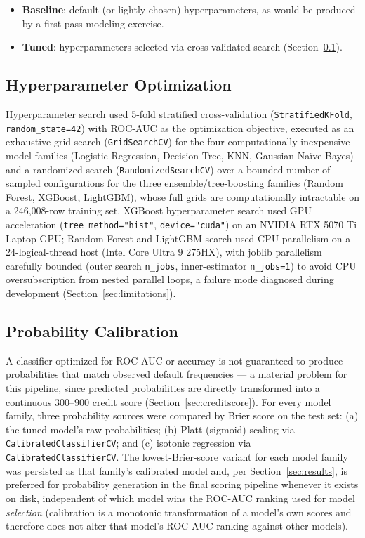 \documentclass[journal]{IEEEtran}
\begin{document}
\begin{itemize}
\item \textbf{Baseline}: default (or lightly chosen) hyperparameters, as would be produced by a first-pass modeling exercise.
\item \textbf{Tuned}: hyperparameters selected via cross-validated search (Section~\ref{sec:hpo}).
\end{itemize}

\subsection{Hyperparameter Optimization}
\label{sec:hpo}

Hyperparameter search used 5-fold stratified cross-validation (\texttt{StratifiedKFold}, \texttt{random\_state=42}) with ROC-AUC as the optimization objective, executed as an exhaustive grid search (\texttt{GridSearchCV}) for the four computationally inexpensive model families (Logistic Regression, Decision Tree, KNN, Gaussian Naïve Bayes) and a randomized search (\texttt{RandomizedSearchCV}) over a bounded number of sampled configurations for the three ensemble/tree-boosting families (Random Forest, XGBoost, LightGBM), whose full grids are computationally intractable on a 246,008-row training set. XGBoost hyperparameter search used GPU acceleration (\texttt{tree\_method="hist"}, \texttt{device="cuda"}) on an NVIDIA RTX 5070 Ti Laptop GPU; Random Forest and LightGBM search used CPU parallelism on a 24-logical-thread host (Intel Core Ultra 9 275HX), with joblib parallelism carefully bounded (outer search \texttt{n\_jobs}, inner-estimator \texttt{n\_jobs=1}) to avoid CPU oversubscription from nested parallel loops, a failure mode diagnosed during development (Section~\ref{sec:limitations}).

\subsection{Probability Calibration}

A classifier optimized for ROC-AUC or accuracy is not guaranteed to produce probabilities that match observed default frequencies --- a material problem for this pipeline, since predicted probabilities are directly transformed into a continuous 300--900 credit score (Section~\ref{sec:creditscore}). For every model family, three probability sources were compared by Brier score on the test set: (a) the tuned model's raw probabilities; (b) Platt (sigmoid) scaling via \texttt{CalibratedClassifierCV}; and (c) isotonic regression via \texttt{CalibratedClassifierCV}. The lowest-Brier-score variant for each model family was persisted as that family's calibrated model and, per Section~\ref{sec:results}, is preferred for probability generation in the final scoring pipeline whenever it exists on disk, independent of which model wins the ROC-AUC ranking used for model \emph{selection} (calibration is a monotonic transformation of a model's own scores and therefore does not alter that model's ROC-AUC ranking against other models).
\end{document}
